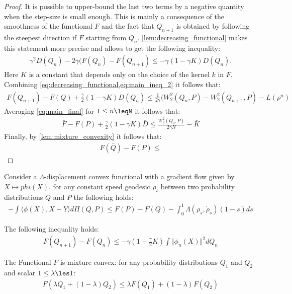 \begin{proof}
It is possible to upper-bound the last two terms by a negative quantity when the step-size is small enough. This is mainly a consequence of the smoothness of the functional $F$ and the fact that $Q_{n+1}$ is obtained by following the steepest direction if $F$ starting from $Q_n$. \ref{lem:decreasing_functional} makes this statement more precise and allows to get the following inequality:
\begin{align}
	\gamma^2 D(Q_n) -2\gamma (F(Q_n)-F(Q_{n+1})\leq -\gamma (1-\gamma K)D(Q_n).
	\label{eq:decreasing_functional}
\end{align}
Here $K$ is a constant that depends only on the choice of the kernel $k$ in $F$. Combining \ref{eq:decreasing_functional,eq:main_ineq_2} it follows that:
\begin{align}
F(Q_{n+1})-F(Q)+\frac{\gamma}{2}(1-\gamma K)D(Q_n)
\leq 
\frac{1}{2\gamma} (W_2^2(Q_n,P)-W_2^2(Q_{n+1},P)-L(\rho^n)
\label{eq:main_final}
\end{align}
Averaging \ref{eq:main_final} for $1\leq n\leqN$ it follows that:
\begin{align}
	\bar{F}-F(P)+\frac{\gamma}{2}(1-\gamma K)\bar{D} \leq \frac{W_2^2(Q_0,P)}{2\gamma N} -\bar{K}
\end{align}
Finally, by \ref{lem:mixture_convexity} it follows that:
\begin{align}
F(\bar{Q})-F(P)\leq 
\end{align}

\end{proof}



\begin{lemma}	\label{lem:grad_flow_lambda_version}
Consider a $\Lambda$-displacement convex functional with a gradient flow given by  $X\mapsto phi(X)$. for any constant speed geodesic $\rho_t$ between two probability distributions $Q$ and $P$ the following holds:
\begin{align*}
	-\int \langle \phi(X),X-Y \rangle d\Pi(Q,P)
	\leq
	F(P)- F(Q) -\int_0^1 \Lambda(\rho_s,\dot{\rho}_s)(1-s)ds
\end{align*}

\end{lemma}


\begin{lemma}\label{lem:decreasing_functional}
	The following inequality holds:
	\begin{align}
		F(Q_{n+1})-F(Q_n)\leq -\gamma (1-\frac{\gamma}{2}K )\int \Vert \phi_n(X)\Vert^2 dQ_n
	\end{align}
\end{lemma}


\begin{lemma}\label{lem:mixture_convexity}
The Functional $F$ is mixture convex: for any probability distributions $Q_1$ and $Q_2$ and scalar $1\leq \lambda\les 1$:
\begin{align}
	F(\lambda Q_1+(1-\lambda)Q_2)\leq \lambda F(Q_1)+ (1-\lambda)F(Q_2)
\end{align}
\end{lemma}
